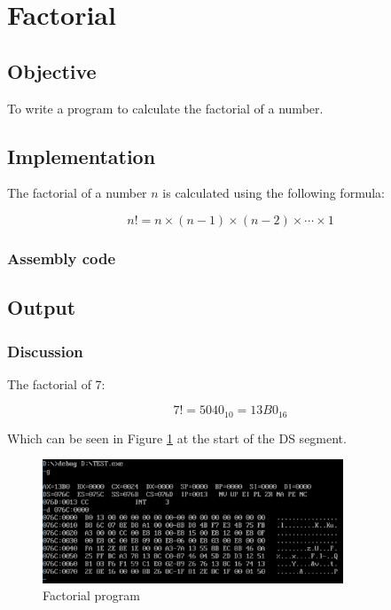 \section{Factorial}

\subsection{Objective}

To write a program to calculate the factorial of a number.

\subsection{Implementation}

The factorial of a number $n$ is calculated using the following formula:

\begin{equation}
	n! = n \times (n-1) \times (n-2) \times \cdots \times 1
\end{equation}

\subsubsection{Assembly code}


\pagebreak

\subsection{Output}

\subsubsection{Discussion}

The factorial of 7:

\begin{equation}
	7! = 5040_{10} = 13B0_{16}
\end{equation}

Which can be seen in Figure \ref{fig:fact} at the start of the DS segment.

\begin{figure}[ht]
	\centering
	\includegraphics[width=0.8\textwidth]{./res/practicals/fact.png}
	\caption{Factorial program}
	\label{fig:fact}
\end{figure}
